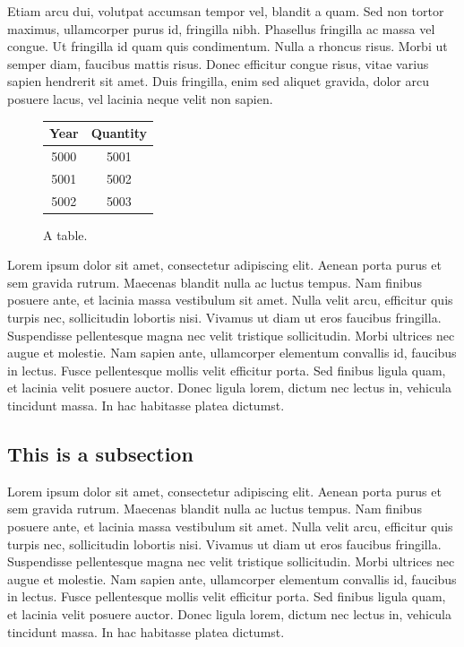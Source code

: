 \documentclass{article}
\begin{document}
Etiam arcu dui, volutpat accumsan tempor vel, blandit a quam. Sed non tortor
maximus, ullamcorper purus id, fringilla nibh. Phasellus fringilla ac massa vel
congue. Ut fringilla id quam quis condimentum. Nulla a rhoncus risus. Morbi ut
semper diam, faucibus mattis risus. Donec efficitur congue risus, vitae varius
sapien hendrerit sit amet. Duis fringilla, enim sed aliquet gravida, dolor arcu
posuere lacus, vel lacinia neque velit non sapien.

\begin{figure}[h]
  \centering
  \begin{tabular}{*{2}{c}}
    \toprule
    Year & Quantity\\
    \midrule
    5000 & 5001\\
    \midrule
    5001 & 5002\\
    \midrule
    5002 & 5003\\
    \bottomrule
  \end{tabular}
  \caption{A table.}
\end{figure}

Lorem ipsum dolor sit amet, consectetur adipiscing elit. Aenean porta purus et
sem gravida rutrum. Maecenas blandit nulla ac luctus tempus. Nam finibus
posuere ante, et lacinia massa vestibulum sit amet. Nulla velit arcu, efficitur
quis turpis nec, sollicitudin lobortis nisi. Vivamus ut diam ut eros faucibus
fringilla. Suspendisse pellentesque magna nec velit tristique sollicitudin.
Morbi ultrices nec augue et molestie. Nam sapien ante, ullamcorper elementum
convallis id, faucibus in lectus. Fusce pellentesque mollis velit efficitur
porta. Sed finibus ligula quam, et lacinia velit posuere auctor. Donec ligula
lorem, dictum nec lectus in, vehicula tincidunt massa. In hac habitasse platea
dictumst.

\subsection{This is a subsection}

Lorem ipsum dolor sit amet, consectetur adipiscing elit.
Aenean porta purus et sem gravida rutrum.
Maecenas blandit nulla ac luctus tempus.
Nam finibus posuere ante, et lacinia massa vestibulum sit amet.
Nulla velit arcu, efficitur quis turpis nec, sollicitudin lobortis nisi.
Vivamus ut diam ut eros faucibus fringilla.
Suspendisse pellentesque magna nec velit tristique sollicitudin.
Morbi ultrices nec augue et molestie.
Nam sapien ante, ullamcorper elementum convallis id, faucibus in lectus.
Fusce pellentesque mollis velit efficitur porta.
Sed finibus ligula quam, et lacinia velit posuere auctor.
Donec ligula lorem, dictum nec lectus in, vehicula tincidunt massa.
In hac habitasse platea dictumst.
\end{document}
